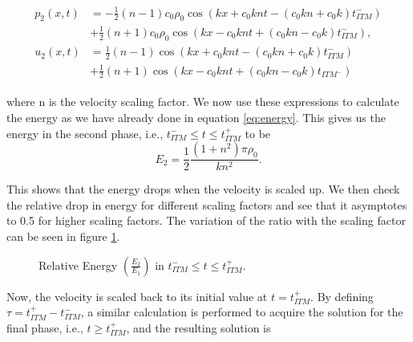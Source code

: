 \begin{align}
    \begin{split}
        p_{2}\left(x, t\right) &= -\frac{1}{2} \left(n-1\right)c_0\rho_0 \cos\left(kx + c_0knt - \left(c_0kn + c_0k\right)t_{ITM}^-\right) \\
        &+ \frac{1}{2} \left(n+1\right)c_0\rho_0\cos\left(kx - c_0knt + \left(c_0kn - c_0k\right)t_{ITM}^-\right), \\
        u_{2}\left(x, t\right) &= \frac{1}{2}\left(n-1\right)\cos\left(kx + c_0knt - \left(c_0kn + c_0k\right)t_{ITM}^-\right)\\
        &+ \frac{1}{2}\left(n+1\right)\cos\left(kx - c_0knt + \left(c_0kn-c_0k\right)t_{ITM^-}\right)
    \end{split}
\end{align}

where n is the velocity scaling factor. We now use these expressions to calculate the energy as we have already done in equation \ref{eq:energy}. This gives us the energy in the second phase, i.e., $t_{ITM}^- \leq t \leq t_{ITM}^+ $ to be
\begin{equation}
    E_2 = \frac{1}{2}\frac{\left(1 + n^2\right)\pi \rho_0}{kn^2} .
\end{equation}

This shows that the energy drops when the velocity is scaled up. We then check the relative drop in energy for different scaling factors and see that it asymptotes to 0.5 for higher scaling factors. The variation of the ratio with the scaling factor can be seen in figure \ref{fig:ratio1}.

\begin{figure}
    \centering
    \caption{Relative Energy $\left(\frac{E_2}{E_1}\right)$ in $t_{ITM}^- \leq t \leq t_{ITM}^+$. }
    \label{fig:ratio1}
\end{figure}

Now, the velocity is scaled back to its initial value at $t=t_{ITM}^+$. By defining $\tau = t_{ITM}^+ - t_{ITM}^-$, a similar calculation is performed to acquire the
solution for the final phase, i.e., $t \geq t_{ITM}^+$, and the resulting solution is

